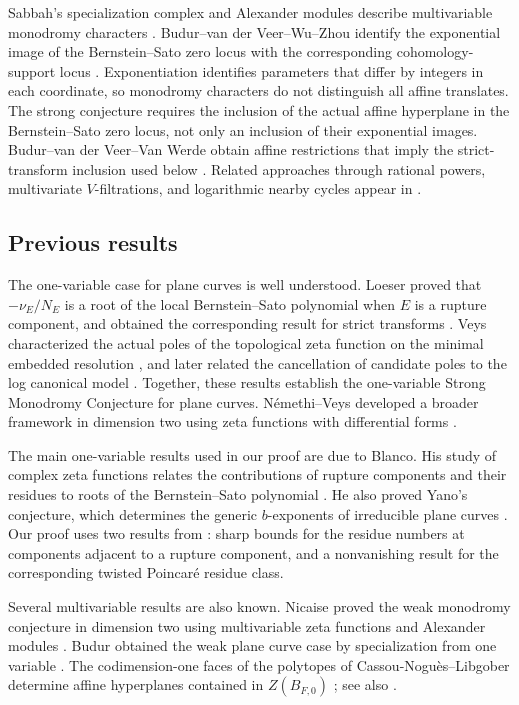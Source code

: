\documentclass[12pt]{amsart}
\numberwithin{equation}{section}
\theoremstyle{plain}
\theoremstyle{definition}
\theoremstyle{remark}
\theoremstyle{definition}
\begin{document}
Sabbah's specialization complex and Alexander modules describe multivariable monodromy characters \cite{Sabbah1990}. Budur--van der Veer--Wu--Zhou identify the exponential image of the Bernstein--Sato zero locus with the corresponding cohomology-support locus \cite{BvdVWZ2021}. Exponentiation identifies parameters that differ by integers in each coordinate, so monodromy characters do not distinguish all affine translates. The strong conjecture requires the inclusion of the actual affine hyperplane in the Bernstein--Sato zero locus, not only an inclusion of their exponential images. Budur--van der Veer--Van Werde obtain affine restrictions that imply the strict-transform inclusion used below \cite{BvdVVW2024}. Related approaches through rational powers, multivariate $V$-filtrations, and logarithmic nearby cycles appear in \cite{Saito2021RationalPowers,DavisYang2026,Wu2026}.

\subsection{Previous results}

The one-variable case for plane curves is well understood. Loeser proved that $-\nu_E/N_E$ is a root of the local Bernstein--Sato polynomial when $E$ is a rupture component, and obtained the corresponding result for strict transforms \cite[Th\'eor\`eme~III.3.1 and Remarque~III.3.3]{Loeser1988}. Veys characterized the actual poles of the topological zeta function on the minimal embedded resolution \cite{Veys1995}, and later related the cancellation of candidate poles to the log canonical model \cite{Veys1997}. Together, these results establish the one-variable Strong Monodromy Conjecture for plane curves. N\'emethi--Veys developed a broader framework in dimension two using zeta functions with differential forms \cite{NemethiVeys2012}.

The main one-variable results used in our proof are due to Blanco. His study of complex zeta functions relates the contributions of rupture components and their residues to roots of the Bernstein--Sato polynomial \cite{Blanco2019}. He also proved Yano's conjecture, which determines the generic $b$-exponents of irreducible plane curves \cite{Blanco2021}. Our proof uses two results from \cite{Blanco2026}: sharp bounds for the residue numbers at components adjacent to a rupture component, and a nonvanishing result for the corresponding twisted Poincar\'e residue class.

Several multivariable results are also known. Nicaise proved the weak monodromy conjecture in dimension two using multivariable zeta functions and Alexander modules \cite{Nicaise2004}. Budur obtained the weak plane curve case by specialization from one variable \cite[Theorem~1.15]{Budur2015}. The codimension-one faces of the polytopes of Cassou-Nogu\`es--Libgober determine affine hyperplanes contained in $Z(B_{F,0})$ \cite[Theorem~4.1]{CNL2011}; see also \cite{CNL2014}.
\end{document}
